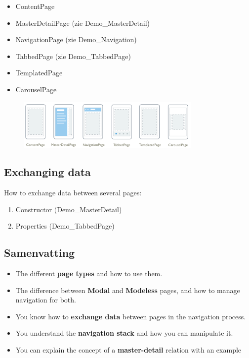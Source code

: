 \documentclass{article}
\newcommand{\bold}[1]{\textbf{#1}}
\begin{document}
\begin{itemize}
    \item ContentPage
    \item MasterDetailPage (zie Demo\_MasterDetail)
    \item NavigationPage (zie Demo\_Navigation)
    \item TabbedPage (zie Demo\_TabbedPage)
    \item TemplatedPage
    \item CarouselPage 
\end{itemize}

\begin{figure}[H]
    \centering
    \includegraphics[width=0.8\textwidth]{pagetypes.png}
    \caption{}
\end{figure}

\subsection{Exchanging data}

How to exchange data between several pages:

\begin{enumerate}
    \item Constructor (Demo\_MasterDetail)
    \item Properties (Demo\_TabbedPage)
\end{enumerate}

\subsection{Samenvatting}

\begin{itemize}
    \item The different \bold{page types} and how to use them.
    \item The difference between \bold{Modal} and \bold{Modeless} pages, and how to manage navigation for both.
    \item You know how to \bold{exchange data} between pages in the navigation process.
    \item You understand the \bold{navigation stack} and how you can manipulate it.
    \item You can explain the concept of a \bold{master-detail} relation with an example
\end{itemize}
\end{document}
